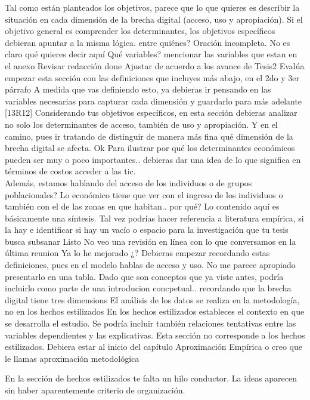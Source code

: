 Tal como están planteados los objetivos, parece que lo que quieres es
describir la situación en cada dimensión de la brecha digital (acceso,
uso y apropiación). Si el objetivo general es comprender los
determinantes, los objetivos específicos debieran apuntar a la misma
lógica. entre quiénes? Oración incompleta. No es claro qué quieres decir
aquí Qué variables? mencionar las variables que estan en el anexo
Revisar redacción done Ajustar de acuerdo a los avance de Tesis2 Evalúa
empezar esta sección con las definiciones que incluyes más abajo, en el
2do y 3er párrafo A medida que vas definiendo esto, ya debieras ir
pensando en las variables necesarias para capturar cada dimensión y
guardarlo para más adelante {[}13R12{]} Considerando tus objetivos
específicos, en esta sección debieras analizar no solo los determinantes
de acceso, también de uso y apropiación. Y en el camino, pues ir
tratando de distinguir de manera más fina qué dimensión de la brecha
digital se afecta. Ok Para ilustrar por qué los determinantes económicos
pueden ser muy o poco importantes.. debieras dar una idea de lo que
significa en términos de costos acceder a las tic.\\
Además, estamos hablando del acceso de los individuos o de grupos
poblacionales? Lo económico tiene que ver con el ingreso de los
individuos o también con el de las zonas en que habitan.. por qué? Lo
contenido aquí es básicamente una síntesis. Tal vez podrías hacer
referencia a literatura empírica, si la hay e identificar si hay un
vacío o espacio para la investigación que tu tesis busca subsanar Listo
No veo una revisión en línea con lo que conversamos en la última reunion
Ya lo he mejorado ¿? Debieras empezar recordando estas definiciones,
pues en el modelo hablas de acceso y uso. No me parece apropiado
presentarlo en una tabla. Dado que son conceptos que ya viste antes,
podría incluirlo como parte de una introducion concpetual.. recordando
que la brecha digital tiene tres dimensions El análisis de los datos se
realiza en la metodología, no en los hechos estilizados En los hechos
estilizados estableces el contexto en que se desarrolla el estudio. Se
podría incluir también relaciones tentativas entre las variables
dependientes y las explicativas. Esta sección no corresponde a los
hechos estilizados. Debiera estar al inicio del capítulo Aproximación
Empírica o creo que le llamas aproximación metodológica

En la sección de hechos estilizados te falta un hilo conductor. La ideas
aparecen sin haber aparentemente criterio de organización.


